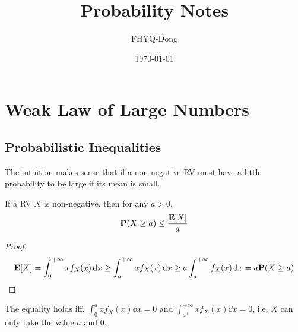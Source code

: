 \documentclass[device=normal, lang=en]{elegantbook}
\title{Probability Notes}
\author{FHYQ-Dong}
\date{\today}
\numberwithin{equation}{section}
\begin{document}
\maketitle
\frontmatter

\tableofcontents
\mainmatter














\chapter{Weak Law of Large Numbers}

\section{Probabilistic Inequalities}
The intuition makes sense that if a non-negative RV must have a little probability to be large if its mean is small.
\begin{theorem}
    If a RV $X$ is non-negative, then for any $a > 0$,
    \begin{equation}
        \mathbf{P}(X \geq a) \leq \frac{\mathbf{E}[X]}{a}
    \end{equation}
\end{theorem}
\begin{proof}
    \begin{equation}
        \mathbf{E}[X] = \int_{0}^{+\infty} xf_X(x) \dd{x} \geq \int_{a}^{+\infty} xf_X(x) \dd{x} \geq a\int_{a}^{+\infty} f_X(x) \dd{x} = a \mathbf{P}(X \geq a)
    \end{equation}
\end{proof}
The equality holds iff. $\int_{0}^{a} xf_X(x) \dd{x} = 0$ and $\int_{a^+}^{+\infty} xf_X(x) \dd{x} = 0$, i.e. $X$ can only take the value $a$ and $0$.
\end{document}
